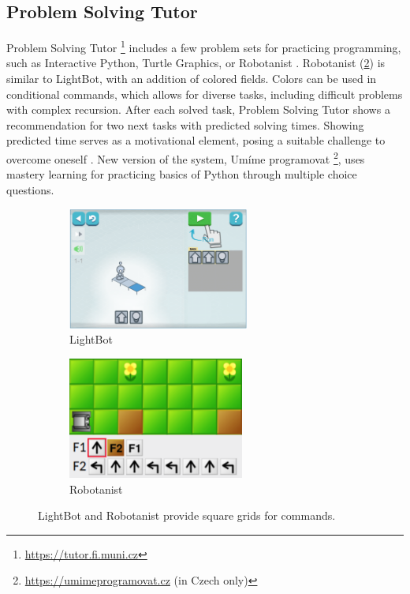 \subsection{Problem Solving Tutor}
\label{sec:problem-solving-tutor}
Problem Solving Tutor%
\footnote{\url{https://tutor.fi.muni.cz}}
includes a few problem sets for practicing programming,
such as Interactive Python, Turtle Graphics, or Robotanist
\cite{proso}.
Robotanist (\cref{fig:robotanist}) is similar to LightBot,
with an addition of colored fields.
Colors can be used in conditional commands, which allows for diverse tasks,
including difficult problems with complex recursion.  After
each solved task, Problem Solving Tutor shows a recommendation for two next
tasks %
with predicted solving times.
Showing predicted time %
serves as a motivational element, posing
a suitable challenge to overcome oneself
\cite{pelanek-student-modeling-times}.
New version of the system, Umíme programovat%
\footnote{\url{https://umimeprogramovat.cz} (in Czech only)},
uses mastery learning for practicing basics of Python through multiple choice questions.



\begin{figure}[htb]
\centering
\begin{subfigure}[t]{0.5\textwidth}
\centering
\includegraphics[height=4cm]{img/lightbot-instruction}
\caption{LightBot}
\label{fig:lightbot}
\end{subfigure}%
\begin{subfigure}[t]{0.5\textwidth}
\centering
\includegraphics[height=4cm]{img/robotanist}
\caption{Robotanist}
\label{fig:robotanist}
\end{subfigure}
\caption{LightBot and Robotanist provide square grids for commands.}
\label{fig:lightbot-robotanist}
\end{figure}



